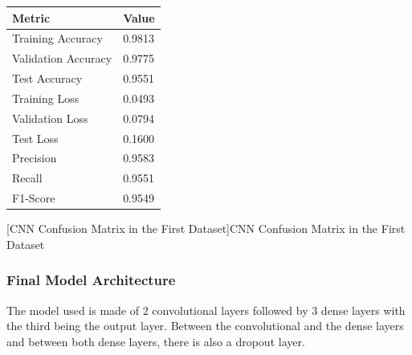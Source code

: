 \begin{minipage}{0.35\textwidth}
    \centering
    \label{table:cnn_dataset1_results}
    \begin{tabular}{ |p{3.4cm}|p{1.1cm}| }
    \hline
    Metric & Value \\
    \hline
    Training Accuracy & 0.9813 \\
    \hline
    Validation Accuracy & 0.9775 \\
    \hline
    Test Accuracy & 0.9551 \\
    \hline
    Training Loss & 0.0493 \\
    \hline
    Validation Loss & 0.0794 \\
    \hline
    Test Loss & 0.1600 \\
    \hline
    Precision & 0.9583 \\
    \hline
    Recall & 0.9551 \\
    \hline
    F1-Score & 0.9549 \\
    \hline
    \end{tabular}
\end{minipage}%
\begin{minipage}{0.65\textwidth}
    \centering
    
    [CNN Confusion Matrix in the First Dataset]{CNN Confusion Matrix in the First Dataset}
    \label{fig:cnn_confusion_matrix}
\end{minipage}

\begin{figure}
    \centering
    \def\svgwidth{\columnwidth}
    
\end{figure}
\fi

\subsubsection{Final Model Architecture}

The model used is made of 2 convolutional layers followed by 3 dense layers with the third being the output layer. Between the convolutional and the dense layers and between both dense layers, there is also a dropout layer.

